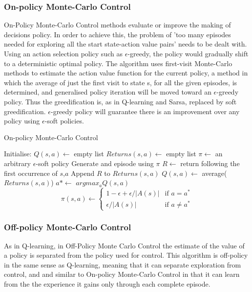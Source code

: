 \documentclass[11pt]{article}
\begin{document}
\subsubsection{On-policy Monte-Carlo Control}
On-Policy Monte-Carlo Control methods evaluate or improve the making of decisions policy. In order to achieve this, the problem of 'too many episodes needed for exploring all the start state-action value pairs' needs to be dealt with. Using an action selection policy such as $\epsilon$-greedy, the policy would gradually shift to a deterministic optimal policy. The algorithm uses first-visit Monte-Carlo methods to estimate the action value function for the current policy, a method in which the average of just the first visit to state s, for all the given episodes, is determined, and generalised policy iteration will be moved toward an $\epsilon$-greedy policy. Thus the greedification is, as in Q-learning and Sarsa, replaced by soft greedification. $\epsilon$-greedy policy will guarantee there is an improvement over any policy using $\epsilon$-soft policies.

\begin{algorithm}
\caption{On-policy Monte-Carlo Control}
\begin{algorithmic}[1]
\label{onpmc}
\STATE Initialise:
\STATE $Q(s,a) \leftarrow$ empty list
\STATE $Returns(s,a) \leftarrow$ empty list
\STATE $\pi \leftarrow$ an arbitrary $\epsilon$-soft policy
\LOOP
\STATE Generate and episode using $\pi$ 
\STATE $R \leftarrow$ return following the first occurrence of $s$,$a$
\STATE Append $R$ to $Returns(s,a)$
\STATE $Q(s,a) \leftarrow$ average($Returns(s,a)$)
\ENDFOR
{}
\STATE $a* \leftarrow$ $arg max_aQ(s,a)$
\STATE 
\begin{equation}
  \pi(s,a) \leftarrow 
  \begin{cases}
    1 - \epsilon + \epsilon/ \left|A(s)\right| & \text{if $a=a^*$}\\  
    \epsilon/ \left|A(s)\right| & \text{if $a \neq a^*$}
  \end{cases}
\end{equation}
\ENDFOR
\ENDFOR
\ENDLOOP
\ENDFOR
\end{algorithmic}
\end{algorithm}

\subsubsection{Off-policy Monte-Carlo Control}
As in Q-learning, in Off-Policy Monte Carlo Control the estimate of the value of a policy is separated from the policy used for control. This algorithm is off-policy in the same sense as Q-learning, meaning that it can separate exploration from control, and and similar to On-policy Monte-Carlo Control in that it can learn from the the experience it gains only through each complete episode.
\end{document}
